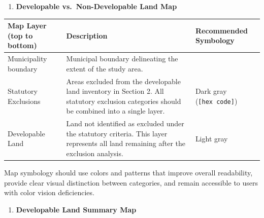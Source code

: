 \documentclass[
  letterpaper,
  DIV=11,
  numbers=noendperiod]{scrreprt}
\newcounter{none} %
\providecommand{\tightlist}{%
  \setlength{\itemsep}{0pt}\setlength{\parskip}{0pt}}
\begin{document}
\begin{enumerate}
\def\labelenumi{\arabic{enumi}.}
\setcounter{enumi}{1}
\tightlist
\item
  \textbf{Developable vs.~Non-Developable Land Map}
\end{enumerate}

{\def\LTcaptype{none} %
\begin{longtable}[]{@{}
  >{\raggedright\arraybackslash}p{}
  >{\raggedright\arraybackslash}p{}
  >{\raggedright\arraybackslash}p{}@{}}
\toprule\noalign{}
\begin{minipage}[b]{\linewidth}\raggedright
Map Layer (top to bottom)
\end{minipage} & \begin{minipage}[b]{\linewidth}\raggedright
Description
\end{minipage} & \begin{minipage}[b]{\linewidth}\raggedright
Recommended Symbology
\end{minipage} \\
\midrule\noalign{}
\endhead
\bottomrule\noalign{}
\endlastfoot
Municipality boundary & Municipal boundary delineating the extent of the
study area. & \\
Statutory Exclusions & Areas excluded from the developable land
inventory in Section 2. All statutory exclusion categories should be
combined into a single layer. & Dark gray (\texttt{{[}hex\ code{]}}) \\
Developable Land & Land not identified as excluded under the statutory
criteria. This layer represents all land remaining after the exclusion
analysis. & Light gray \\
\end{longtable}
}

Map symbology should use colors and patterns that improve overall
readability, provide clear visual distinction between categories, and
remain accessible to users with color vision deficiencies.

\begin{enumerate}
\def\labelenumi{\arabic{enumi}.}
\setcounter{enumi}{2}
\tightlist
\item
  \textbf{Developable Land Summary Map}
\end{enumerate}
\end{document}
